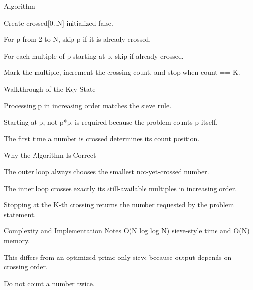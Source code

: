 \documentclass[aspectratio=169,11pt]{beamer}
\begin{document}
\begin{frame}{Algorithm}
\begin{tightitemize}
  \item Create crossed[0..N] initialized false.
  \item For p from 2 to N, skip p if it is already crossed.
  \item For each multiple of p starting at p, skip if already crossed.
  \item Mark the multiple, increment the crossing count, and stop when count == K.
\end{tightitemize}
\end{frame}

\begin{frame}{Walkthrough of the Key State}
\begin{tightitemize}
  \item Processing p in increasing order matches the sieve rule.
  \item Starting at p, not p*p, is required because the problem counts p itself.
  \item The first time a number is crossed determines its count position.
\end{tightitemize}
\end{frame}

\begin{frame}{Why the Algorithm Is Correct}
\begin{tightitemize}
  \item The outer loop always chooses the smallest not-yet-crossed number.
  \item The inner loop crosses exactly its still-available multiples in increasing order.
  \item Stopping at the K-th crossing returns the number requested by the problem statement.
\end{tightitemize}
\end{frame}

\begin{frame}{Complexity and Implementation Notes}
\small
{} O(N log log N) sieve-style time and O(N) memory.

\vspace{0.3cm}
\begin{tightitemize}
  \item This differs from an optimized prime-only sieve because output depends on crossing order.
  \item Do not count a number twice.
\end{tightitemize}
\end{frame}
\end{document}
